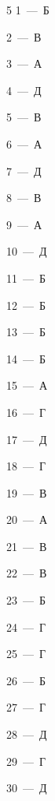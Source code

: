 \documentclass[12pt]{article}
\begin{document}
\begin{samepage}
\par{}
\end{samepage}

\clearpage
{}

\par\vspace{0.3cm}

\begin{multicols}{5}\noindent
\mbox{1~--- Б}\par
\mbox{2~--- В}\par
\mbox{3~--- А}\par
\mbox{4~--- Д}\par
\mbox{5~--- В}\par
\mbox{6~--- А}\par
\mbox{7~--- Д}\par
\mbox{8~--- В}\par
\mbox{9~--- А}\par
\mbox{10~--- Д}\par
\mbox{11~--- Б}\par
\mbox{12~--- Б}\par
\mbox{13~--- Б}\par
\mbox{14~--- Б}\par
\mbox{15~--- А}\par
\mbox{16~--- Г}\par
\mbox{17~--- Д}\par
\mbox{18~--- Г}\par
\mbox{19~--- В}\par
\mbox{20~--- А}\par
\mbox{21~--- В}\par
\mbox{22~--- В}\par
\mbox{23~--- Б}\par
\mbox{24~--- Г}\par
\mbox{25~--- Г}\par
\mbox{26~--- Б}\par
\mbox{27~--- Г}\par
\mbox{28~--- Д}\par
\mbox{29~--- Г}\par
\mbox{30~--- Д}\par

\end{multicols}
\end{document}
